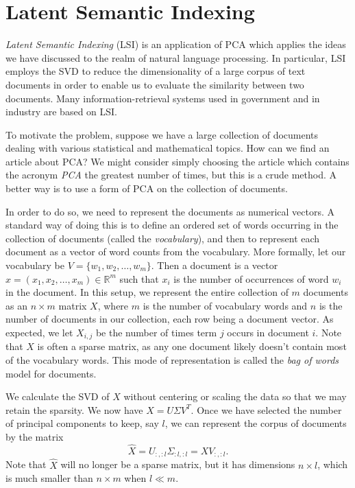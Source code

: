 \section*{Latent Semantic Indexing}
\emph{Latent Semantic Indexing} (LSI) is an application of PCA which applies the ideas we have discussed to the realm of natural language processing.
In particular, LSI employs the SVD to reduce the dimensionality of a large corpus of text documents in order to enable us to evaluate the similarity between two documents.
Many information-retrieval systems used in government and in industry are based on LSI.

To motivate the problem, suppose we have a large collection of documents dealing with various statistical and mathematical topics.
How can we find an article about PCA?
We might consider simply choosing the article which contains the acronym \emph{PCA} the greatest number of times, but this is a crude method.
A better way is to use a form of PCA on the collection of documents.

In order to do so, we need to represent the documents as numerical vectors.
A standard way of doing this is to define an ordered set of words occurring in the collection of documents (called the \emph{vocabulary}), and then to
represent each document as a vector of word counts from the vocabulary.
More formally, let our vocabulary be $V = \{w_1,w_2,\ldots,w_m\}$.
Then a document is a vector $x  = (x_1,x_2,\ldots,x_m) \in \mathbb{R}^m$ such that $x_i$ is the number of occurrences of word $w_i$ in the document.
In this setup, we represent the entire collection of $m$ documents as an $n \times m$ matrix $X$, where $m$ is the number of vocabulary words and $n$ is the number of documents in our collection, each row being a document vector.
As expected, we let $X_{i,j}$ be the number of times term $j$ occurs in document $i$.
Note that $X$ is often a sparse matrix, as any one document likely doesn't contain most of the vocabulary words.
This mode of representation is called the \emph{bag of words} model for documents.

We calculate the SVD of $X$ without centering or scaling the data so that we may retain the sparsity.
We now have $X = U\Sigma V^T$. Once we have selected the number of principal components to keep, say $l$, we can represent the corpus of documents by the matrix
\[
\widehat{X} = U_{:,:l}\Sigma_{:l,:l} = XV_{:,:l}.
\]
Note that $\widehat{X}$ will no longer be a sparse matrix, but it has dimensions $n \times l$, which is much smaller than $n \times m$ when $l \ll m$.

